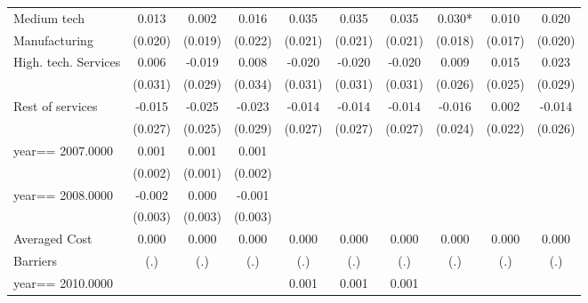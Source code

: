 \begin{table}[htbp]
\begin{tabular}{l*{9}{c}}
Medium tech         &       0.013   &       0.002   &       0.016   &       0.035   &       0.035   &       0.035   &       0.030*  &       0.010   &       0.020   \\
Manufacturing       &     (0.020)   &     (0.019)   &     (0.022)   &     (0.021)   &     (0.021)   &     (0.021)   &     (0.018)   &     (0.017)   &     (0.020)   \\
High. tech. Services&       0.006   &      -0.019   &       0.008   &      -0.020   &      -0.020   &      -0.020   &       0.009   &       0.015   &       0.023   \\
                    &     (0.031)   &     (0.029)   &     (0.034)   &     (0.031)   &     (0.031)   &     (0.031)   &     (0.026)   &     (0.025)   &     (0.029)   \\
Rest of services    &      -0.015   &      -0.025   &      -0.023   &      -0.014   &      -0.014   &      -0.014   &      -0.016   &       0.002   &      -0.014   \\
                    &     (0.027)   &     (0.025)   &     (0.029)   &     (0.027)   &     (0.027)   &     (0.027)   &     (0.024)   &     (0.022)   &     (0.026)   \\
year==  2007.0000   &       0.001   &       0.001   &       0.001   &               &               &               &               &               &               \\
                    &     (0.002)   &     (0.001)   &     (0.002)   &               &               &               &               &               &               \\
year==  2008.0000   &      -0.002   &       0.000   &      -0.001   &               &               &               &               &               &               \\
                    &     (0.003)   &     (0.003)   &     (0.003)   &               &               &               &               &               &               \\
Averaged Cost       &       0.000   &       0.000   &       0.000   &       0.000   &       0.000   &       0.000   &       0.000   &       0.000   &       0.000   \\
Barriers            &         (.)   &         (.)   &         (.)   &         (.)   &         (.)   &         (.)   &         (.)   &         (.)   &         (.)   \\
year==  2010.0000   &               &               &               &       0.001   &       0.001   &       0.001   &               &               &               \\

\end{tabular}
\end{table}
